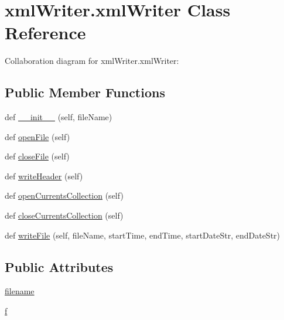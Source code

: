 \hypertarget{classxml_writer_1_1xml_writer}{}\section{xml\+Writer.\+xml\+Writer Class Reference}
\label{classxml_writer_1_1xml_writer}


Collaboration diagram for xml\+Writer.\+xml\+Writer\+:
\subsection*{Public Member Functions}
\begin{DoxyCompactItemize}
\item 
def \mbox{\hyperlink{classxml_writer_1_1xml_writer_a0b43f6115153b244e10d1933ee33500a}{\+\_\+\+\_\+init\+\_\+\+\_\+}} (self, file\+Name)
\item 
def \mbox{\hyperlink{classxml_writer_1_1xml_writer_a9697485604ee2a4be4fff52911fea34f}{open\+File}} (self)
\item 
def \mbox{\hyperlink{classxml_writer_1_1xml_writer_ad0738ca597cf9a517e13e50bb3be5c96}{close\+File}} (self)
\item 
def \mbox{\hyperlink{classxml_writer_1_1xml_writer_aa05ece2d045f4be023b005b42e892736}{write\+Header}} (self)
\item 
def \mbox{\hyperlink{classxml_writer_1_1xml_writer_a69b2a24925be449bc0e416e4cd2d3816}{open\+Currents\+Collection}} (self)
\item 
def \mbox{\hyperlink{classxml_writer_1_1xml_writer_adfbe5387ec461435f294e98767cff534}{close\+Currents\+Collection}} (self)
\item 
def \mbox{\hyperlink{classxml_writer_1_1xml_writer_ab686ea3fea2fc1122eb2878aaa61e6b7}{write\+File}} (self, file\+Name, start\+Time, end\+Time, start\+Date\+Str, end\+Date\+Str)
\end{DoxyCompactItemize}
\subsection*{Public Attributes}
\begin{DoxyCompactItemize}
\item 
\mbox{\hyperlink{classxml_writer_1_1xml_writer_a4842af70f50831bd8981fc2be0a9fe01}{filename}}
\item 
\mbox{\hyperlink{classxml_writer_1_1xml_writer_a1ecd576801e94caa6dcc033ceb534111}{f}}
\end{DoxyCompactItemize}



